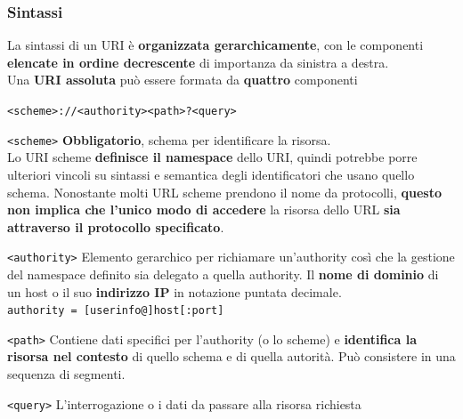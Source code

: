 \documentclass[10pt]{article}
\begin{document}
\subsubsection{Sintassi}
La sintassi di un URI è \textbf{organizzata gerarchicamente}, con le componenti \textbf{elencate in ordine decrescente} di importanza da sinistra a destra.\\
Una \textbf{URI assoluta} può essere formata da \textbf{quattro} componenti\\
\begin{center}
\texttt{<scheme>://<authority><path>?<query>}
\end{center}
\begin{list}{}{}
\item \texttt{<scheme>} \textbf{Obbligatorio}, schema per identificare la risorsa.\\
Lo URI scheme \textbf{definisce il namespace} dello URI, quindi potrebbe porre ulteriori vincoli su sintassi e semantica degli identificatori che usano quello schema. Nonostante molti URL scheme prendono il nome da protocolli, \textbf{questo non implica che l'unico modo di accedere} la risorsa dello URL \textbf{sia attraverso il protocollo specificato}.
\item \texttt{<authority>} Elemento gerarchico per richiamare un'authority così che la gestione del namespace definito sia delegato a quella authority. Il \textbf{nome di dominio} di un host o il suo \textbf{indirizzo IP} in notazione puntata decimale.\\
\texttt{authority = [userinfo@]host[:port]}
\item \texttt{<path>} Contiene dati specifici per l’authority (o lo scheme) e \textbf{identifica la risorsa nel contesto} di quello schema e di quella autorità. Può consistere in una sequenza di segmenti.
\item \texttt{<query>} L'interrogazione o i dati da passare alla risorsa richiesta
\end{list}
\end{document}
